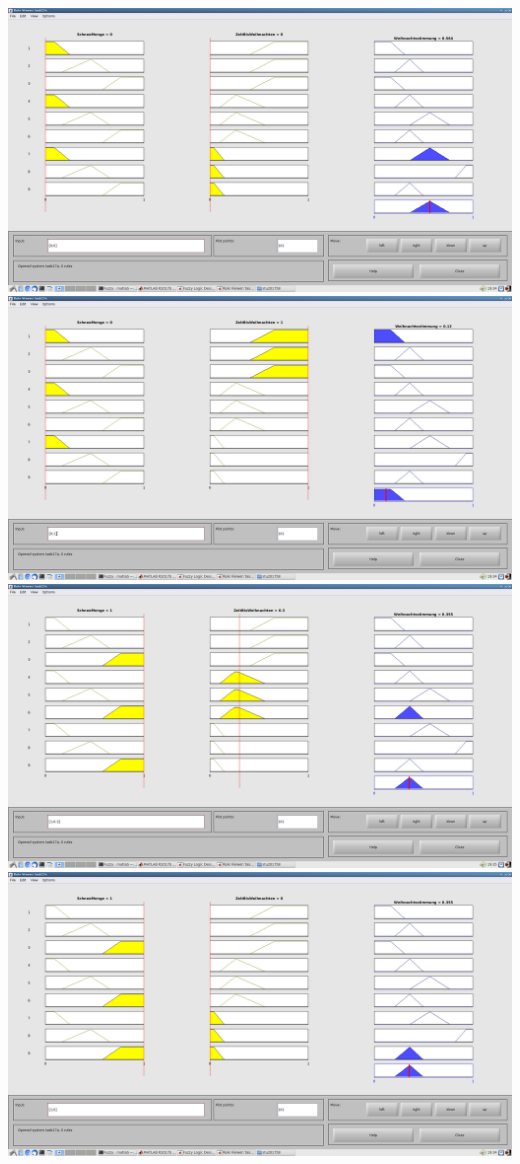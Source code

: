 \includegraphics[width=\textwidth]{part/screenshots/fuzzy-17c-K04-0-0}
\includegraphics[width=\textwidth]{part/screenshots/fuzzy-17c-K04-0-1}
\includegraphics[width=\textwidth]{part/screenshots/fuzzy-17c-K04-1-0,3}
\includegraphics[width=\textwidth]{part/screenshots/fuzzy-17c-K04-1-0}
